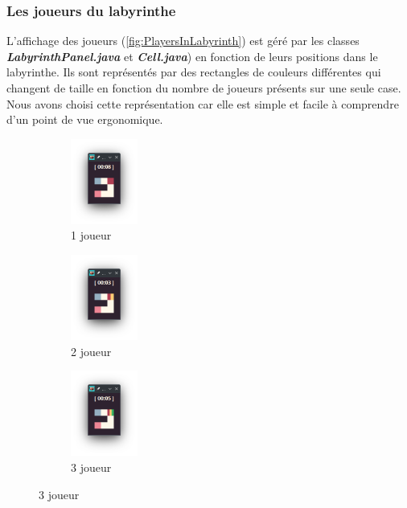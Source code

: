 \subsubsection*{Les joueurs du labyrinthe}

L'affichage des joueurs (\ref{fig:PlayersInLabyrinth}) est géré par les classes \textbf{\textit{LabyrinthPanel.java}} et \textbf{\textit{Cell.java}}) en fonction de leurs positions dans le labyrinthe. Ils sont représentés par des rectangles de couleurs différentes qui changent de taille en fonction du nombre de joueurs présents sur une seule case. Nous avons choisi cette représentation car elle est simple et facile à comprendre d'un point de vue ergonomique.

\begin{figure}[!htb]
    \centering
    \begin{subfigure}{2.2cm}
        \includegraphics[width=2.2cm]{ressources/Implementation/Labyrinthe/Vue/Players/1Player.png}%
        \caption{1 joueur}
        \label{fig:1Player}
    \end{subfigure}
    \qquad
    \begin{subfigure}{2.2cm}
        \includegraphics[width=2.2cm]{ressources/Implementation/Labyrinthe/Vue/Players/2Players.png}%
        \caption{2 joueur}
        \label{fig:2Players}
    \end{subfigure}
    \qquad
    \begin{subfigure}{2.2cm}
        \includegraphics[width=2.2cm]{ressources/Implementation/Labyrinthe/Vue/Players/3Players.png}%
        \caption{3 joueur}
        \label{fig:3Players}

\end{subfigure}
\end{figure}
